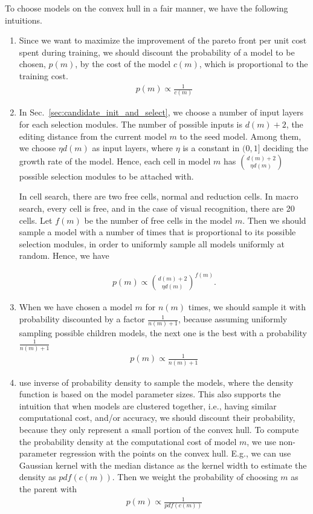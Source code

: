 To choose models on the convex hull in a fair manner, we have the following intuitions.
\begin{enumerate}
\item 
Since we want to maximize the improvement of the pareto front per unit cost spent during training, we should discount the probability of a model to be chosen, $p(m)$, by the cost of the model $c(m)$, which is proportional to the training cost.
\begin{align}
    p(m) \propto \frac{1}{c(m)}
\end{align}

\item 
In Sec.~\ref{sec:candidate_init_and_select}, we choose a number of input layers for each selection modules. The number of possible inputs is $d(m) + 2$, the editing distance from the current model $m$ to the seed model. Among them, we choose $\eta d(m)$ as input layers, where $\eta$ is a constant in $(0,1]$ deciding the growth rate of the model. 
Hence, each cell in model $m$ has ${ d(m) + 2 \choose \eta d(m) }$ possible selection modules to be attached with. 

In cell search, there are two free cells, normal and reduction cells. In macro search, every cell is free, and in the case of visual recognition, there are 20 cells. Let $f(m)$ be the number of free cells in the model $m$. Then we should sample a model with a number of times that is proportional to its possible selection modules, in order to uniformly sample all models uniformly at random. Hence, we have

\begin{align}
    p(m) \propto { d(m) + 2 \choose \eta d(m) } ^{f(m)}.
\end{align}



\item 
When we have chosen a model $m$ for $n(m)$ times, we should sample it with probability discounted by a factor $\frac{1}{n(m) + 1}$, because assuming uniformly sampling possible children models, the next one is the best with a probability $\frac{1}{n(m) + 1}$
\begin{align}
    p(m) \propto \frac{1}{n(m) + 1}
\end{align}

\item 
\citet{Elsken2018EfficientMN} use inverse of probability density to sample the models, where the density function is based on the model parameter sizes. This also supports the intuition that 
when models are clustered together, i.e., having similar computational cost, and/or accuracy, we should discount their probability, because they only represent a small portion of the convex hull. 
To compute the probability density at the computational cost of model $m$, we use non-parameter regression with the points on the convex hull. E.g., we can use Gaussian kernel with the median distance as the kernel width to estimate the density as $pdf(c(m))$. Then we weight the probability of choosing $m$ as the parent with 
\begin{align}
    p(m) \propto \frac{1}{pdf(c(m))}
\end{align}


\end{enumerate}

